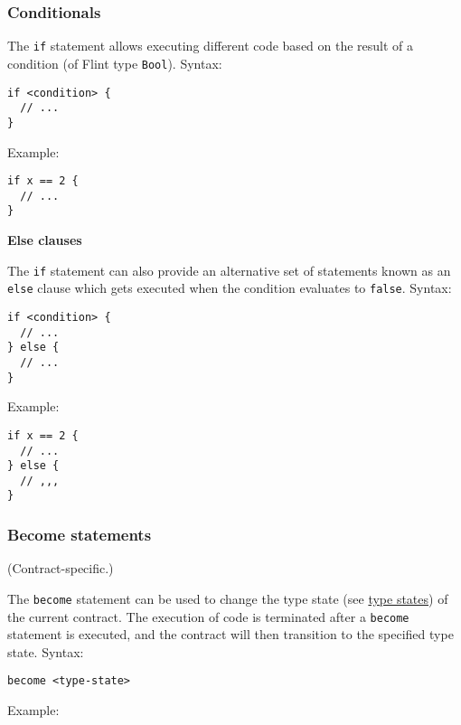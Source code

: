 \subsubsection{Conditionals}
\label{sec:appendix-b-conditionals}

The \texttt{if} statement allows executing different code based on the result of a condition (of Flint type \texttt{Bool}). Syntax:

\begin{verbatim}
if <condition> {
  // ...
}
\end{verbatim}

Example:

\begin{verbatim}
if x == 2 {
  // ...
}
\end{verbatim}

\textbf{Else clauses}
\label{sec:appendix-b-else-clauses}

The \texttt{if} statement can also provide an alternative set of statements known as an \texttt{else} clause which gets executed when the condition evaluates to \texttt{false}. Syntax:

\begin{verbatim}
if <condition> {
  // ...
} else {
  // ...
}
\end{verbatim}

Example:

\begin{verbatim}
if x == 2 {
  // ...
} else {
  // ,,,
}
\end{verbatim}

\subsubsection{Become statements}
\label{sec:appendix-b-become-statements}

(Contract-specific.)

The \texttt{become} statement can be used to change the type state (see \hyperref[sec:appendix-b-type-states]{type states}) of the current contract. The execution of code is terminated after a \texttt{become} statement is executed, and the contract will then transition to the specified type state. Syntax:

\begin{verbatim}
become <type-state>
\end{verbatim}

Example:

